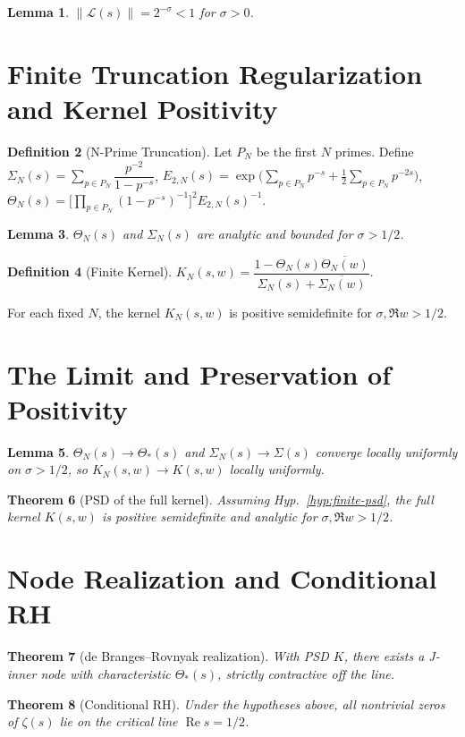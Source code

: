 \documentclass[11pt]{article}
\newcommand{\ReS}{\operatorname{Re}}
\newcommand{\Th}{\Theta_*}
\newcommand{\ThN}{\Theta_N}
\newcommand{\Si}{\Sigma}
\newcommand{\SiN}{\Sigma_N}
\newcommand{\kN}{K_N}
\theoremstyle{plain}
\newtheorem{theorem}{Theorem}
\newtheorem{lemma}[theorem]{Lemma}
\theoremstyle{definition}
\newtheorem{definition}[theorem]{Definition}
\begin{document}
\begin{lemma}\label{lem:arith-norm}
$\|\mathcal{L}(s)\| = 2^{-\sigma} <1$ for $\sigma > 0$.
\end{lemma}

\section{Finite Truncation Regularization and Kernel Positivity}

\begin{definition}[N-Prime Truncation]
Let $P_N$ be the first $N$ primes. Define $\SiN(s) = \sum_{p\in P_N} \dfrac{p^{-2}}{1 - p^{-s}}$, $E_{2,N}(s) = \exp\big(\sum_{p\in P_N} p^{-s} + \tfrac12 \sum_{p\in P_N} p^{-2s}\big)$, $\ThN(s) = \Big[\prod_{p\in P_N} (1 - p^{-s})^{-1}\Big]^2 E_{2,N}(s)^{-1}$.
\end{definition}

\begin{lemma}\label{lem:finite-analytic}
$\ThN(s)$ and $\SiN(s)$ are analytic and bounded for $\sigma > 1/2$.
\end{lemma}

\begin{definition}[Finite Kernel]
$\kN(s, w) = \dfrac{1 - \ThN(s) \overline{\ThN(w)}}{\SiN(s) + \overline{\SiN(w)}}$.
\end{definition}

\begin{hypothesis}\label{hyp:finite-psd}
For each fixed $N$, the kernel $\kN(s,w)$ is positive semidefinite for $\sigma, \Re w > 1/2$.
\end{hypothesis}

\section{The Limit and Preservation of Positivity}

\begin{lemma}\label{lem:convergence}
$\ThN(s) \to \Th(s)$ and $\SiN(s) \to \Si(s)$ converge locally uniformly on $\sigma > 1/2$, so $\kN(s, w) \to K(s, w)$ locally uniformly.
\end{lemma}

\begin{theorem}[PSD of the full kernel]
Assuming Hyp.~\ref{hyp:finite-psd}, the full kernel $K(s, w)$ is positive semidefinite and analytic for $\sigma, \Re w > 1/2$.
\end{theorem}

\section{Node Realization and Conditional RH}

\begin{theorem}[de Branges--Rovnyak realization]
With PSD $K$, there exists a J-inner node with characteristic $\Th(s)$, strictly contractive off the line.
\end{theorem}

\begin{theorem}[Conditional RH]
Under the hypotheses above, all nontrivial zeros of $\zeta(s)$ lie on the critical line $\ReS s = 1/2$.
\end{theorem}
\end{document}
